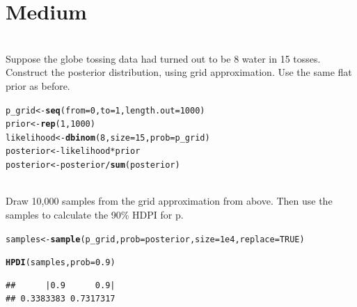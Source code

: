 \documentclass[12pt]{article}\usepackage[]{graphicx}\usepackage[]{color}
\makeatletter
\newcommand{\hlnum}[1]{\textcolor[rgb]{0.686,0.059,0.569}{#1}}%
\newcommand{\hlopt}[1]{\textcolor[rgb]{0,0,0}{#1}}%
\newcommand{\hlstd}[1]{\textcolor[rgb]{0.345,0.345,0.345}{#1}}%
\newcommand{\hlkwb}[1]{\textcolor[rgb]{0.69,0.353,0.396}{#1}}%
\newcommand{\hlkwc}[1]{\textcolor[rgb]{0.333,0.667,0.333}{#1}}%
\newcommand{\hlkwd}[1]{\textcolor[rgb]{0.737,0.353,0.396}{\textbf{#1}}}%
\newenvironment{kframe}{%
 \def\at@end@of@kframe{}%
 \ifinner\ifhmode%
  \def\at@end@of@kframe{\end{minipage}}%
  \begin{minipage}{\columnwidth}%
 \fi\fi%
 \def\FrameCommand##1{\hskip\@totalleftmargin \hskip-\fboxsep
 \colorbox{shadecolor}{##1}\hskip-\fboxsep
     \hskip-\linewidth \hskip-\@totalleftmargin \hskip\columnwidth}%
 \MakeFramed {\advance\hsize-\width
   \@totalleftmargin\z@ \linewidth\hsize
   \@setminipage}}%
 {\par\unskip\endMakeFramed%
 \at@end@of@kframe}
\newenvironment{knitrout}{}{} %
\newenvironment{problem}[2][Problem]{\begin{trivlist}
\item[\hskip \labelsep {\bfseries #1}\hskip \labelsep {\bfseries #2.}]}{\end{trivlist}}
\makeatother
\begin{document}
\section{Medium}

\begin{problem}{3M1}
\text{}\\
Suppose the globe tossing data had turned out to be 8 water in 15 tosses. Construct the posterior distribution, using grid approximation. Use the same flat prior as before.
\end{problem}

\begin{knitrout}
\color{fgcolor}\begin{kframe}
\begin{alltt}
\hlstd{p_grid} \hlkwb{<-} \hlkwd{seq}\hlstd{(}\hlkwc{from} \hlstd{=} \hlnum{0}\hlstd{,} \hlkwc{to} \hlstd{=} \hlnum{1}\hlstd{,} \hlkwc{length.out} \hlstd{=} \hlnum{1000}\hlstd{)}
\hlstd{prior} \hlkwb{<-} \hlkwd{rep}\hlstd{(}\hlnum{1}\hlstd{,} \hlnum{1000}\hlstd{)}
\hlstd{likelihood} \hlkwb{<-} \hlkwd{dbinom}\hlstd{(}\hlnum{8}\hlstd{,} \hlkwc{size} \hlstd{=} \hlnum{15}\hlstd{,} \hlkwc{prob} \hlstd{= p_grid)}
\hlstd{posterior} \hlkwb{<-} \hlstd{likelihood}\hlopt{*}\hlstd{prior}
\hlstd{posterior} \hlkwb{<-} \hlstd{posterior} \hlopt{/} \hlkwd{sum}\hlstd{(posterior)}
\end{alltt}
\end{kframe}
\end{knitrout}

\begin{problem}{3M2}
\text{}\\
Draw 10,000 samples from the grid approximation from above. Then use the samples to calculate the 90\% HDPI for p.
\end{problem}

\begin{knitrout}
\color{fgcolor}\begin{kframe}
\begin{alltt}
\hlstd{samples} \hlkwb{<-} \hlkwd{sample}\hlstd{(p_grid,} \hlkwc{prob} \hlstd{= posterior,} \hlkwc{size} \hlstd{=} \hlnum{1e4}\hlstd{,} \hlkwc{replace} \hlstd{=} \hlnum{TRUE}\hlstd{)}

\hlkwd{HPDI}\hlstd{(samples,} \hlkwc{prob} \hlstd{=} \hlnum{0.9}\hlstd{)}
\end{alltt}
\begin{verbatim}
##      |0.9      0.9| 
## 0.3383383 0.7317317
\end{verbatim}
\end{kframe}
\end{knitrout}
\end{document}

